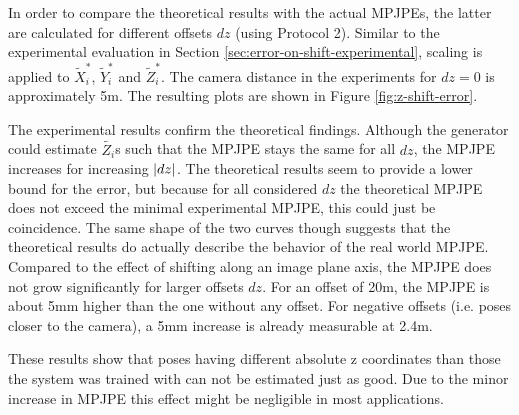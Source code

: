 

In order to compare the theoretical results with the actual MPJPEs, the latter are calculated for different offsets $dz$ (using Protocol 2).
Similar to the experimental evaluation in Section \ref{sec:error-on-shift-experimental}, scaling is applied to $\widetilde{X}_i^\ast$, $\widetilde{Y}_i^\ast$ and $\widetilde{Z}_i^\ast$.
The camera distance in the experiments for $dz = 0$ is approximately 5m.
The resulting plots are shown in Figure \ref{fig:z-shift-error}.

The experimental results confirm the theoretical findings.
Although the generator could estimate $\widetilde{Z_i}$s such that the MPJPE stays the same for all $dz$, the MPJPE increases for increasing $\abs{dz}$.
The theoretical results seem to provide a lower bound for the error, but because for all considered $dz$ the theoretical MPJPE does not exceed the minimal experimental MPJPE, this could just be coincidence.
The same shape of the two curves though suggests that the theoretical results do actually describe the behavior of the real world MPJPE.
Compared to the effect of shifting along an image plane axis, the MPJPE does not grow significantly for larger offsets $dz$.
For an offset of 20m, the MPJPE is about 5mm higher than the one without any offset.
For negative offsets (i.e. poses closer to the camera), a 5mm increase is already measurable at 2.4m.

These results show that poses having different absolute z coordinates than those the system was trained with can not be estimated just as good.
Due to the minor increase in MPJPE this effect might be negligible in most applications.
